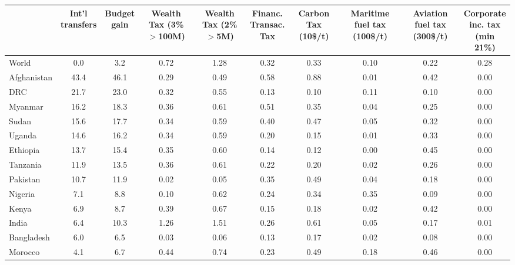 
\begin{tabular}[t]{lccccccccc}
\toprule
  & \makecell{Int'l\\transfers} & \makecell{Budget\\gain} & \makecell{Wealth\\Tax (3\%\\$>$100M)} & \makecell{Wealth\\Tax (2\%\\$>$5M)} & \makecell{Financ.\\Transac.\\Tax} & \makecell{Carbon\\Tax\\(10\$/t)} & \makecell{Maritime\\fuel tax\\(100\$/t)} & \makecell{Aviation\\fuel tax\\(300\$/t)} & \makecell{Corporate\\inc. tax\\(min 21\%)}\\
\midrule
World & 0.0 & 3.2 & 0.72 & 1.28 & 0.32 & 0.33 & 0.10 & 0.22 & 0.28\\
Afghanistan & 43.4 & 46.1 & 0.29 & 0.49 & 0.58 & 0.88 & 0.01 & 0.42 & 0.00\\
DRC & 21.7 & 23.0 & 0.32 & 0.55 & 0.13 & 0.10 & 0.11 & 0.10 & 0.00\\
Myanmar & 16.2 & 18.3 & 0.36 & 0.61 & 0.51 & 0.35 & 0.04 & 0.25 & 0.00\\
Sudan & 15.6 & 17.7 & 0.34 & 0.59 & 0.40 & 0.47 & 0.05 & 0.32 & 0.00\\
Uganda & 14.6 & 16.2 & 0.34 & 0.59 & 0.20 & 0.15 & 0.01 & 0.33 & 0.00\\
Ethiopia & 13.7 & 15.4 & 0.35 & 0.60 & 0.14 & 0.12 & 0.00 & 0.45 & 0.00\\
Tanzania & 11.9 & 13.5 & 0.36 & 0.61 & 0.22 & 0.20 & 0.02 & 0.26 & 0.00\\
Pakistan & 10.7 & 11.9 & 0.02 & 0.05 & 0.35 & 0.49 & 0.04 & 0.18 & 0.00\\
Nigeria & 7.1 & 8.8 & 0.10 & 0.62 & 0.24 & 0.34 & 0.35 & 0.09 & 0.00\\
Kenya & 6.9 & 8.7 & 0.39 & 0.67 & 0.15 & 0.18 & 0.02 & 0.42 & 0.00\\
India & 6.4 & 10.3 & 1.26 & 1.51 & 0.26 & 0.61 & 0.05 & 0.17 & 0.01\\
Bangladesh & 6.0 & 6.5 & 0.03 & 0.06 & 0.13 & 0.17 & 0.02 & 0.08 & 0.00\\
Morocco & 4.1 & 6.7 & 0.44 & 0.74 & 0.23 & 0.49 & 0.18 & 0.46 & 0.00\\

\end{tabular}
